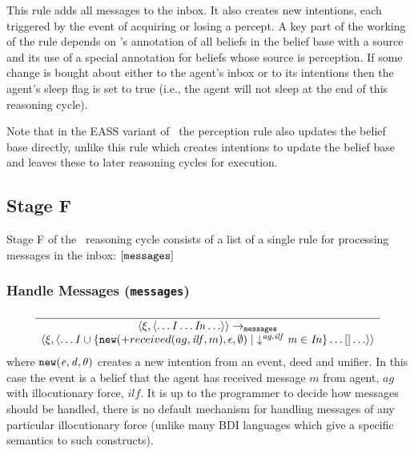 This rule adds all
messages to the inbox.  It also creates 
new intentions, each triggered by the event of acquiring or losing
a percept.  A key part of the working of the rule depends on \ail{}'s annotation of all beliefs in the belief base with a source and its use of a special annotation for beliefs whose source is perception.  If some change is bought about either to the agent's inbox or to its intentions then the agent's sleep flag is set to true (i.e., the agent will  not sleep at the end of this reasoning cycle).

Note that in the {\sc EASS} variant of \gwendolen\ the perception rule also updates the belief base directly, unlike this rule which creates intentions to update the belief base and leaves these to later reasoning cycles for execution.

\subsection{Stage F}

Stage F of the \gwendolen\ reasoning cycle consists of a list of a single rule for processing messages in the inbox: $[ {\tt messages} ]$

\subsubsection*{Handle Messages (\texttt{messages})}
\begin{equation}
\frac{
}{
\begin{array}{c}
\langle \xi, \langle \ldots \mathit{I} \ldots \mathit{In} \ldots \rangle \rangle 
\rightarrow_{\tt messages} \\
\langle \xi, \langle \ldots \mathit{I} \cup \{{\tt new}(+received(ag,\mathit{ilf}, m),\epsilon,\emptyset) \mid \mathit{\downarrow^{ag,ilf}m}  \in \mathit{In}\} \ldots
[] \ldots \rangle \rangle
\end{array}
}
\end{equation}
where ${\tt new}(\mathit{e}, \mathit{d}, \theta)$ creates a new intention from an event, deed and unifier.  In this case the event is a belief that the agent has received message $m$ from agent, $ag$ with illocutionary force, $\mathit{ilf}$.  It is up to the programmer to decide how messages should be  handled, there is no default mechanism for handling messages of any particular illocutionary force (unlike many BDI languages which give a specific semantics to such constructs).


